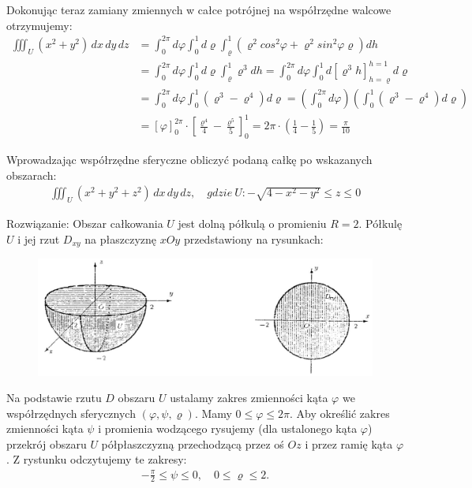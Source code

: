 \documentclass[12pt]{article}
\begin{document}
    Dokonując teraz zamiany zmiennych w całce potrójnej na współrzędne walcowe otrzymujemy:
    \begin{align*}
        \iiint_U (x^2+y^2) \,dx\,dy\,dz &= \int_{0}^{2\pi} d\varphi \int_{0}^{1} d\varrho \int_{\varrho}^{1} (\varrho^2 cos^2\varphi+\varrho^2sin^2\varphi \varrho) dh 
        \\ &= \int_{0}^{2\pi} d\varphi \int_{0}^{1} d\varrho \int_{\varrho}^{1} \varrho^3 dh = \int_{0}^{2\pi} d\varphi \int_{0}^{1} d \left[ \varrho^3 h \right]_{h=\varrho}^{h=1} d\varrho 
        \\ &= \int_{0}^{2\pi} d\varphi \int_{0}^{1} (\varrho^3 - \varrho^4) d\varrho  = \left(\int_{0}^{2\pi}d\varphi\right) \left( \int_{0}^{1} (\varrho^3 - \varrho^4) d\varrho\right) 
        \\ &= \left[\varphi\right]_0^{2\pi} \cdot \left[\frac{\varrho^4}{4} - \frac{\varrho^5}{5}\right]_0^1 = 2\pi \cdot \left(\frac{1}{4}-\frac{1}{5}\right) = \frac{\pi}{10}
    \end{align*}
    
    
    \begin{exercise}
        Wprowadzając współrzędne sferyczne obliczyć podaną całkę po wskazanych obszarach:
        \begin{align*}
            \iiint_U (x^2+y^2+z^2) \,dx\,dy\,dz, \quad gdzie \ U: -\sqrt{4-x^2-y^2} \leq z \leq 0 
        \end{align*}
    \end{exercise}
    Rozwiązanie:
    Obszar całkowania $U$ jest dolną półkulą o promieniu $R=2$. Półkulę $U$ i jej rzut $D_{xy}$ na płaszczyznę $xOy$ przedstawiony na rysunkach:
    
    \begin{figure}[H]
        \includegraphics[width=\linewidth]{28_2a.jpg}
    \end{figure}
    
    Na podstawie rzutu $D$ obszaru $U$ ustalamy zakres zmienności kąta $\varphi$ we współrzędnych sferycznych $(\varphi, \psi, \varrho)$. Mamy $0 \leq \varphi \leq 2\pi$. Aby określić zakres zmienności kąta $\psi$ i promienia wodzącego rysujemy (dla ustalonego kąta $\varphi$) przekrój obszaru $U$ półpłaszczyzną przechodzącą przez oś $Oz$ i przez ramię kąta $\varphi$. Z rystunku odczytujemy te zakresy: 
    \begin{align*}
        -\frac{\pi}{2} \leq \psi \leq 0, \quad 0 \leq \varrho \leq 2.
    \end{align*}
    
\end{document}
